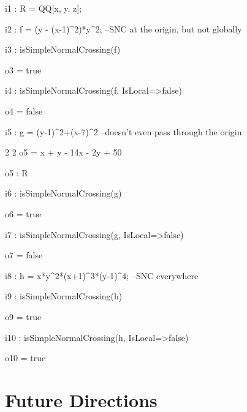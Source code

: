 \documentclass{amsart}
\begin{document}
{\small
{}
\begin{MyVerbatim}

i1 : R = QQ[x, y, z];

i2 : f = (y - (x-1)^2)*y^2; --SNC at the origin, but not globally

i3 : isSimpleNormalCrossing(f)

o3 = true

i4 : isSimpleNormalCrossing(f, IsLocal=>false)

o4 = false

i5 : g = (y-1)^2+(x-7)^2 --doesn't even pass through the origin

       2    2
o5 = x  + y  - 14x - 2y + 50

o5 : R

i6 : isSimpleNormalCrossing(g)

o6 = true

i7 : isSimpleNormalCrossing(g, IsLocal=>false)

o7 = false

i8 : h = x*y^2*(x+1)^3*(y-1)^4; --SNC everywhere

i9 : isSimpleNormalCrossing(h)

o9 = true

i10 : isSimpleNormalCrossing(h, IsLocal=>false)

o10 = true
\end{MyVerbatim}
}
\medspace












\newpage
\section{Future Directions}
\label{sec.FutureDirections}
\end{document}
